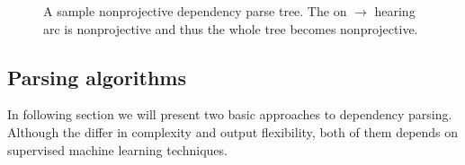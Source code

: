 \begin{figure}[!htbp]
  \centering
  \caption{A sample nonprojective dependency parse tree. The on $\rightarrow$ hearing arc is
    nonprojective and thus the whole tree becomes nonprojective.}
  \label{fig:dependency_nonproj}
\end{figure}

\subsection{Parsing algorithms}
In following section we will present two basic approaches to dependency parsing.
Although the differ in complexity and output flexibility, both of them depends
on supervised machine learning techniques.

